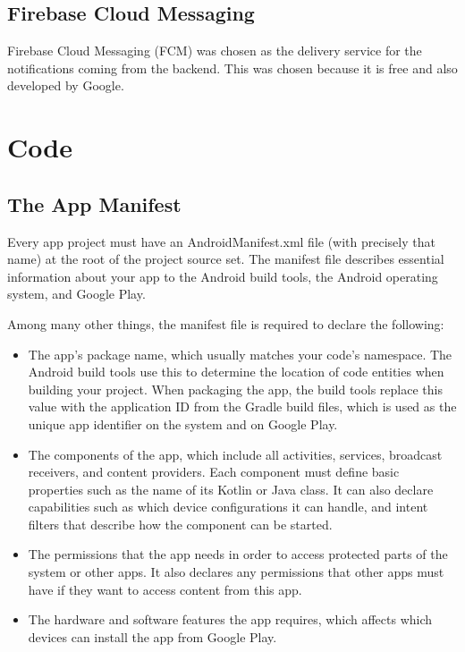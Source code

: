  \subsection{Firebase Cloud Messaging}
 Firebase Cloud Messaging (FCM) was chosen as the delivery service for the notifications coming from the backend. This was chosen because it is free and also developed by Google\cite{FCM}.
\section{Code}

\subsection{The App Manifest ~\cite{appManifest}}
Every app project must have an AndroidManifest.xml file (with precisely that name) at the root of the project source set. The manifest file describes essential information about your app to the Android build tools, the Android operating system, and Google Play.

Among many other things, the manifest file is required to declare the following:
\begin{itemize}
	\item The app's package name, which usually matches your code's namespace. The Android build tools use this to determine the location of code entities when building your project. When packaging the app, the build tools replace this value with the application ID from the Gradle build files, which is used as the unique app identifier on the system and on Google Play. 
\item The components of the app, which include all activities, services, broadcast receivers, and content providers. Each component must define basic properties such as the name of its Kotlin or Java class. It can also declare capabilities such as which device configurations it can handle, and intent filters that describe how the component can be started.

\item The permissions that the app needs in order to access protected parts of the system or other apps. It also declares any permissions that other apps must have if they want to access content from this app. 

\item The hardware and software features the app requires, which affects which devices can install the app from Google Play. \end{itemize}

